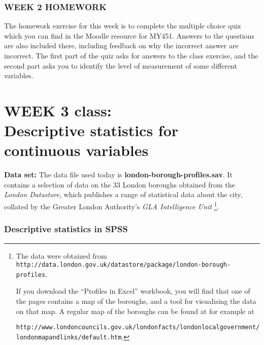 \subsubsection{WEEK 2 HOMEWORK}

The homework exercise for this week is to complete the multiple choice quiz
which you can find in the Moodle resource
for MY451. Answers to the questions are also included there, including feedback on
why the incorrect answer are incorrect. The first part of the quiz asks for answers
to the class exercise, and the second part asks you to identify the level of measurement
of some different variables.

\clearpage
\section[Week 3: Descriptive statistics 2]{WEEK 3 class:\\Descriptive statistics for continuous variables}

\textbf{Data set:}
The data file used today is \textbf{london-borough-profiles.sav}. It contains
a selection of data on the 33 London boroughs obtained from the \emph{London Datastore},
which publishes a range of statistical data about the city, collated by the Greater London Authority's
\emph{GLA Intelligence Unit}
\footnote{The data were
obtained from
{\scriptsize\texttt{http://data.london.gov.uk/datastore/package/london-borough-profiles}}.

\noindent If you download the ``Profiles in Excel'' workbook, you will find that one of the pages contains
a map of the boroughs, and a tool for visualising the data on that map. A regular map of the boroughs
can be found at for example at

{\scriptsize\texttt{http://www.londoncouncils.gov.uk/londonfacts/londonlocalgovernment/londonmapandlinks/default.htm}}.}.


\subsubsection{Descriptive statistics in SPSS}


